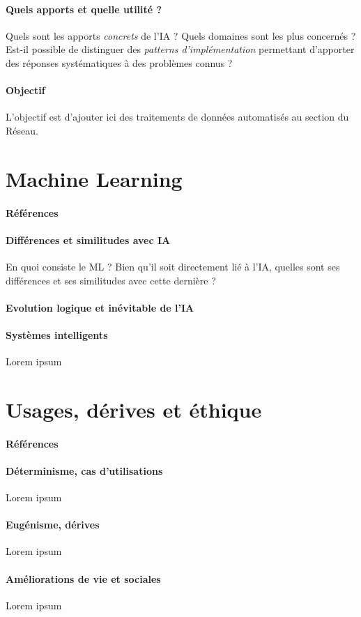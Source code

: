 \paragraph{Quels apports et quelle utilité ?} Quels sont les apports \emph{concrets}
de l'IA ? Quels domaines sont les plus concernés ? Est-il possible de distinguer
des \emph{patterns d'implémentation} permettant d'apporter des réponses systématiques
à des problèmes connus ?

\paragraph{Objectif} L'objectif est d'ajouter ici des traitements de données automatisés au section
du Réseau.

\section{Machine Learning}
\paragraph{Références} \cite{AlphaGo0} \cite{AlphaGo1}

\paragraph{Différences et similitudes avec IA} En quoi consiste le ML ? Bien qu'il soit
directement lié à l'IA, quelles sont ses différences et ses similitudes avec cette dernière ?

\paragraph{Evolution logique et inévitable de l'IA} 

\paragraph{Systèmes intelligents} Lorem ipsum


\section{Usages, dérives et éthique}
\paragraph{Références} \cite{Asimov0} \cite{Damasio0}

\paragraph{Déterminisme, cas d'utilisations} Lorem ipsum

\paragraph{Eugénisme, dérives} Lorem ipsum

\paragraph{Améliorations de vie et sociales} Lorem ipsum